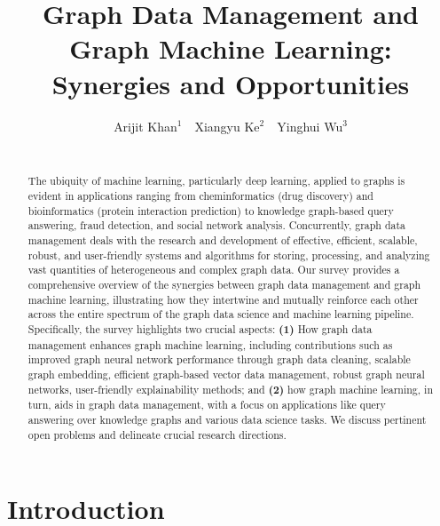 \documentclass{sig-alternate-10pt}
\begin{document}
\pagestyle{empty}

\title{Graph Data Management and Graph Machine Learning: Synergies and Opportunities}

\author{Arijit Khan$^1$ \,\, Xiangyu Ke$^2$ \,\, Yinghui Wu$^3$  \\
\\
}



\maketitle


\vspace{-1in}


\begin{abstract}
The ubiquity of machine learning, particularly deep learning, applied to graphs is evident in applications ranging from cheminformatics (drug discovery) and bioinformatics (protein interaction prediction) to knowledge graph-based query answering, fraud detection, and social network analysis.
Concurrently, graph data management deals with the research and development of effective, efficient, scalable, robust, and user-friendly systems and algorithms for storing, processing, and analyzing vast quantities of heterogeneous and complex graph data.
Our survey provides a comprehensive overview of the synergies between graph data management and graph machine learning, illustrating how they intertwine and mutually reinforce each other across the entire spectrum of the graph data science and machine learning pipeline. Specifically, the survey highlights two crucial aspects:
{\bf (1)} How graph data management enhances graph machine learning, including contributions such as improved graph neural network performance through graph data cleaning, scalable graph embedding, efficient graph-based vector data management, robust graph neural networks, user-friendly explainability methods; and
{\bf (2)} how graph machine learning, in turn, aids in graph data management, with a focus on applications like query answering over knowledge graphs and various data science tasks.
We discuss pertinent open problems and delineate crucial research directions.
\end{abstract}


\section{Introduction}
\label{sec:introduction}
\end{document}
